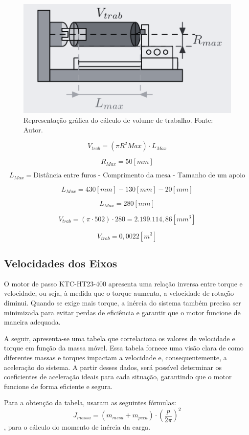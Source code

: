 \begin{figure}[h!]
    \centering
    \includegraphics[width=0.8\linewidth]{images/vtrab.png}
    \caption{Representação gráfica do cálculo de volume de trabalho. Fonte: Autor.}
    \label{fig:vtrab}
\end{figure}

$$V_{trab} =(\pi R^2 Max) \cdot L_{Max}$$

$$R_{Max} = 50[mm]$$

$$L_{Max} = \text{Distância entre furos - Comprimento da mesa - Tamanho de um apoio}$$

$$L_{Max} =430[mm] - 130[mm] - 20[mm]$$

$$L_{Max} = 280[mm]$$

$$V_{trab} =(\pi \cdot 502) \cdot 280 = 2.199.114,86[mm^3]$$

$$V_{trab} = 0,0022[m^3]$$

\subsection{Velocidades dos Eixos}

O motor de passo KTC-HT23-400 apresenta uma relação inversa entre torque e velocidade, ou seja, à medida que o torque aumenta, a velocidade de rotação diminui. Quando se exige mais torque, a inércia do sistema também precisa ser minimizada para evitar perdas de eficiência e garantir que o motor funcione de maneira adequada.

A seguir, apresenta-se uma tabela que correlaciona os valores de velocidade e torque em função da massa móvel. Essa tabela fornece uma visão clara de como diferentes massas e torques impactam a velocidade e, consequentemente, a aceleração do sistema. A partir desses dados, será possível determinar os coeficientes de aceleração ideais para cada situação, garantindo que o motor funcione de forma eficiente e segura.

Para a obtenção da tabela, usaram as seguintes fórmulas: 
\begin{equation}
    J_{massa} = (m_{mesa} + m_{peca}) \cdot (\frac{p}{2\pi})^2
\end{equation}, para o cálculo do momento de inércia da carga. 

